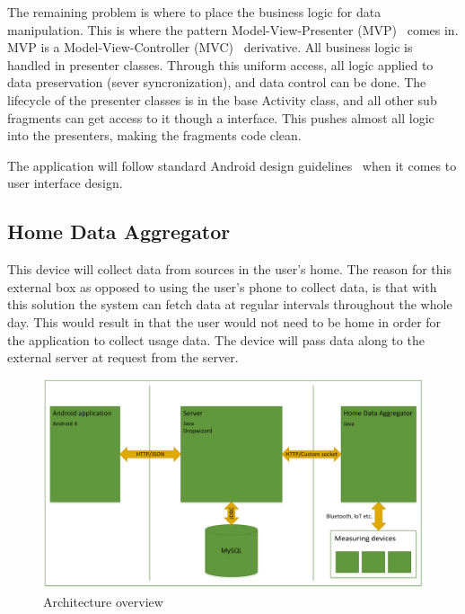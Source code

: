 The remaining problem is where to place the business logic for data manipulation. This is where the pattern Model-View-Presenter (MVP)~\cite{mvp} comes in. MVP is a Model-View-Controller (MVC)~\cite{mvc} derivative. All business logic is handled in presenter classes. Through this uniform access, all logic applied to data preservation (sever syncronization), and data control can be done. The lifecycle of the presenter classes is in the base Activity class, and all other sub fragments can get access to it though a interface. This pushes almost all logic into the presenters, making the fragments code clean.

The application will follow standard Android design guidelines~\cite{androidgui}
when it comes to user interface design.

\subsection{Home Data Aggregator}
This device will collect data from sources in the user's home. The reason for this external box as opposed to using 
the user's phone to collect data, is that with this solution the system can fetch data at regular intervals throughout 
the whole day. This would result in that the user would not need to be home in order for the application to collect 
usage data. The device will pass data along to the external server at request from the server.

\begin{figure}[H]
\includegraphics[width=\textwidth]{ch/implementation/fig/architecture.png}
\caption{Architecture overview}
\end{figure}
